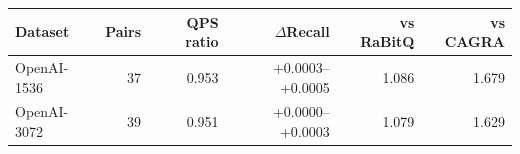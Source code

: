 \begin{tabular}{@{}lrrrrr@{}}
\toprule
Dataset & Pairs & QPS ratio & $\Delta$Recall & vs RaBitQ & vs CAGRA \\
\midrule
OpenAI-1536 & 37 & 0.953 & +0.0003--+0.0005 & 1.086 & 1.679 \\
OpenAI-3072 & 39 & 0.951 & +0.0000--+0.0003 & 1.079 & 1.629 \\
\bottomrule
\end{tabular}
